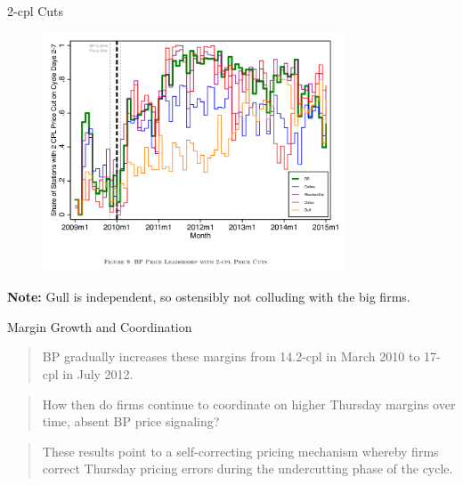 \documentclass[dvipsnames]{beamer}
\begin{document}
  \begin{frame}{2-cpl Cuts}
    \begin{figure}[htp]
      \centering
      \includegraphics[width=0.8\textwidth, keepaspectratio=true]{fig9.png}
    \end{figure}
    \textbf{Note:} Gull is independent, so ostensibly not colluding with the big firms. 
  \end{frame}
  \begin{frame}{Margin Growth and Coordination}
    \begin{quote}
      BP gradually increases these margins from 14.2-cpl in March 2010 to 17-cpl in July 2012.
    \end{quote}
    \vfill
    \begin{quote}
      How then do firms continue to coordinate on higher Thursday margins over time, absent BP price signaling?
    \end{quote}
    \vfill
    \begin{quote}
      These results point to a self-correcting pricing mechanism whereby firms correct Thursday pricing errors during the undercutting phase of the cycle.
    \end{quote}
  \end{frame}
\end{document}
